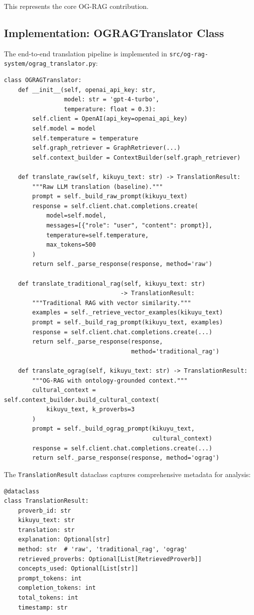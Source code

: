 This represents the core OG-RAG contribution.

\subsection{Implementation: OGRAGTranslator Class}
\label{subsec:ograg_translator_impl}

The end-to-end translation pipeline is implemented in \texttt{src/og-rag-system/ograg\_translator.py}:

\begin{verbatim}
class OGRAGTranslator:
    def __init__(self, openai_api_key: str, 
                 model: str = 'gpt-4-turbo',
                 temperature: float = 0.3):
        self.client = OpenAI(api_key=openai_api_key)
        self.model = model
        self.temperature = temperature
        self.graph_retriever = GraphRetriever(...)
        self.context_builder = ContextBuilder(self.graph_retriever)
    
    def translate_raw(self, kikuyu_text: str) -> TranslationResult:
        """Raw LLM translation (baseline)."""
        prompt = self._build_raw_prompt(kikuyu_text)
        response = self.client.chat.completions.create(
            model=self.model,
            messages=[{"role": "user", "content": prompt}],
            temperature=self.temperature,
            max_tokens=500
        )
        return self._parse_response(response, method='raw')
    
    def translate_traditional_rag(self, kikuyu_text: str) 
                                 -> TranslationResult:
        """Traditional RAG with vector similarity."""
        examples = self._retrieve_vector_examples(kikuyu_text)
        prompt = self._build_rag_prompt(kikuyu_text, examples)
        response = self.client.chat.completions.create(...)
        return self._parse_response(response, 
                                    method='traditional_rag')
    
    def translate_ograg(self, kikuyu_text: str) -> TranslationResult:
        """OG-RAG with ontology-grounded context."""
        cultural_context = self.context_builder.build_cultural_context(
            kikuyu_text, k_proverbs=3
        )
        prompt = self._build_ograg_prompt(kikuyu_text, 
                                          cultural_context)
        response = self.client.chat.completions.create(...)
        return self._parse_response(response, method='ograg')
\end{verbatim}

The \texttt{TranslationResult} dataclass captures comprehensive metadata for analysis:
\begin{verbatim}
@dataclass
class TranslationResult:
    proverb_id: str
    kikuyu_text: str
    translation: str
    explanation: Optional[str]
    method: str  # 'raw', 'traditional_rag', 'ograg'
    retrieved_proverbs: Optional[List[RetrievedProverb]]
    concepts_used: Optional[List[str]]
    prompt_tokens: int
    completion_tokens: int
    total_tokens: int
    timestamp: str
\end{verbatim}

